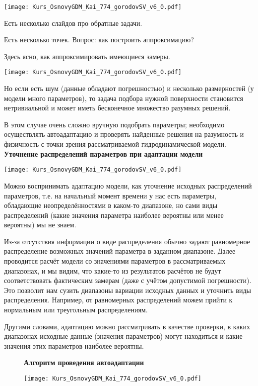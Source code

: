 \texttt{[image: Kurs\_OsnovyGDM\_Kai\_774\_gorodovSV\_v6\_0.pdf]}

Есть несколько слайдов про обратные задачи.

Есть несколько точек. Вопрос: как построить аппроксимацию?

Здесь ясно, как аппроксимировать имеющиеся замеры.

\texttt{[image: Kurs\_OsnovyGDM\_Kai\_774\_gorodovSV\_v6\_0.pdf]}

Но если есть шум (данные обладают погрешностью) и несколько размерностей (у модели много параметров), то задача подбора нужной поверхности становится нетривиальной и может иметь бесконечное множество разумных решений.

В этом случае очень сложно вручную подобрать параметры; необходимо осуществлять автоадаптацию и проверять найденные решения на разумность и физичность с точки зрения рассматриваемой гидродинамической модели.
\\

\textbf{Уточнение распределений параметров при адаптации модели}

\texttt{[image: Kurs\_OsnovyGDM\_Kai\_774\_gorodovSV\_v6\_0.pdf]}

Можно воспринимать адаптацию модели, как уточнение исходных распределений параметров, т.е. на начальный момент времени у нас есть параметры, обладающие неопределённостями в каком-то диапазоне, но сами виды распределений (какие значения параметра наиболее вероятны или менее вероятны) мы не знаем.

Из-за отсутствия информации о виде распределения обычно задают равномерное распределение возможных значений параметра в заданном диапазоне.
Далее проводится расчёт модели со значениями параметров в рассматриваемых диапазонах, и мы видим, что какие-то из результатов расчётов не будут соответствовать фактическим замерам (даже с учётом допустимой погрешности).
Это позволит нам сузить диапазоны вариации исходных данных и уточнить виды распределения.
Например, от равномерных распределений можем прийти к нормальным или треугольным распределениям.

Другими словами, адаптацию можно рассматривать в качестве проверки, в каких диапазонах исходные данные (значения параметров) могут находиться и какие значения этих параметров наиболее вероятны.

\begin{figure}[H]
\textbf{Алгоритм проведения автоадаптации}

\texttt{[image: Kurs\_OsnovyGDM\_Kai\_774\_gorodovSV\_v6\_0.pdf]}
\end{figure}


